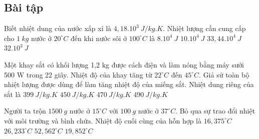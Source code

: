 \subsection{Bài tập}
\begin{ex} 
	Biết nhiệt dung của nước xấp xỉ là $4,18 . 10^3\ J/kg.K$. Nhiệt lượng cần cung cấp cho $1\ kg$ nước ở $20^\circ C$ đến khi nước sôi ở  $100^\circ C$ là
	\choice
	{$8 . 10^4\ J$}
	{$10 . 10^4\ J$}
	{\True $33,44 . 10^4\ J$}
	{$32 . 10^3\ J$}
\end{ex}
\begin{ex}
	Một khay sắt có khối lượng 1,2 kg được cách điện và làm nóng bằng máy sưởi 500 W trong 22 giây. Nhiệt độ của khay tăng từ $22^\circ C$ đến $45^\circ C$.  Giả sử toàn bộ nhiệt lượng được dùng để làm tăng nhiệt độ của miếng sắt. Nhiệt dung riêng của sắt là
	\choice
	{\True $399\ J/kg.K$}
	{$450\ J/kg.K$}
	{$470\ J/kg.K$}
	{$490\ J/kg.K$}
	\end{ex}
\begin{ex} 
	Người ta trộn $1500 \ g$ nước ở $15^\circ C$ với $100 \ g$ nước ở $37^\circ C$. Bỏ qua sự trao đổi nhiệt với môi trường và bình chứa. Nhiệt độ cuối cùng của hỗn hợp là
	\choice
	{\True $16,375^\circ C$}
	{$26,233^\circ C$}
	{$52,562^\circ C$}
	{$19,852^\circ C$}
\end{ex}

